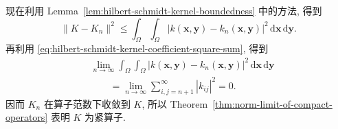 \begin{Proof}
现在利用 Lemma~\ref{lem:hilbert-schmidt-kernel-boundedness} 中的方法, 得到
\begin{equation}\label{eq:hilbert-schmidt-truncation-operator-norm-bound}
\|K-K_n\|^2\leq\int_\Omega\int_\Omega|k(\bm{x},\bm{y})-k_n(\bm{x},\bm{y})|^2\,\mathrm{d}\bm{x}\,\mathrm{d}\bm{y}.
\end{equation}
再利用 \eqref{eq:hilbert-schmidt-kernel-coefficient-square-sum}, 得到
\begin{equation}\label{eq:hilbert-schmidt-truncation-coefficient-tail}
\begin{aligned}
&\lim_{n\to\infty}\int_\Omega\int_\Omega|k(\bm{x},\bm{y})-k_n(\bm{x},\bm{y})|^2\,\mathrm{d}\bm{x}\,\mathrm{d}\bm{y}\\
&\qquad=\lim_{n\to\infty}\sum_{i,j=n+1}^\infty|k_{ij}|^2=0.
\end{aligned}
\end{equation}
因而 $K_n$ 在算子范数下收敛到 $K$, 所以 Theorem~\ref{thm:norm-limit-of-compact-operators} 表明 $K$ 为紧算子.
\end{Proof}
\endgroup
